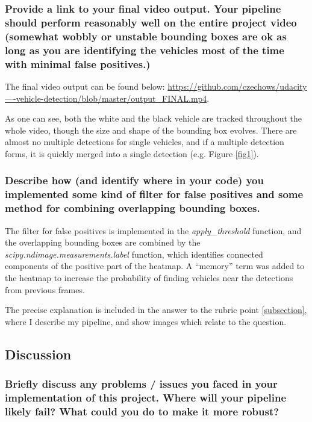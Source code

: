 \documentclass[a4paper,10pt]{article}
\begin{document}
\subsubsection{Provide a link to your final video output. Your pipeline should perform reasonably well on the entire project video 
(somewhat wobbly or unstable bounding boxes are ok as long as you are identifying the vehicles most of the time with minimal false positives.)}

The final video output can be found below:
\href{https://github.com/czechows/udacity----vehicle-detection/blob/master/output_FINAL.mp4}{https://github.com/czechows/udacity----vehicle-detection/blob/master/output\_FINAL.mp4}.

As one can see, both the white and the black vehicle are tracked throughout the whole video, though the size and shape of the bounding box evolves.
There are almost no multiple detections for single vehicles, and if a multiple detection forms,
it is quickly merged into a single detection (e.g. Figure \ref{fig1}).


\subsubsection{Describe how (and identify where in your code) you implemented some kind of filter for false positives and some method for combining overlapping bounding boxes.}

The filter for false positives is implemented in the \emph{apply\_threshold} function,
and the overlapping bounding boxes are combined by the \emph{scipy.ndimage.measurements.label} function,
which identifies connected components of the positive part of the heatmap.
A ``memory'' term was added to the heatmap to increase the probability of finding vehicles near the detections from previous frames.

The precise explanation is included in the answer to the rubric point \ref{subsection}, where I describe my pipeline, and show images which relate to the question.

\subsection{Discussion}

\subsubsection{Briefly discuss any problems / issues you faced in your implementation of this project. Where will your pipeline likely fail? What could you do to make it more robust?}
\end{document}

